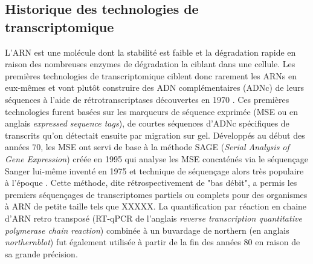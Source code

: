 \subsection{Historique des technologies de transcriptomique}

L'ARN est une molécule dont la stabilité est faible et la dégradation rapide en raison des nombreuses enzymes de dégradation la ciblant dans une cellule. Les premières technologies de transcriptomique ciblent donc rarement les ARNs en eux-mêmes et vont plutôt construire des ADN complémentaires (ADNc) de leurs séquences à l'aide de rétrotranscriptases découvertes en 1970 \cite{Temin1970Jun}. Ces premières technologies furent basées sur les marqueurs de séquence exprimée (MSE ou en anglais \textit{expressed sequence tags}), de courtes séquences d'ADNc spécifiques de transcrits qu'on détectait ensuite par migration sur gel. Développés au début des années 70, les MSE ont servi de base à la méthode SAGE (\textit{Serial Analysis of Gene Expression}) créée en 1995 \cite{Velculescu1995Oct} qui analyse les MSE concaténés via le séquençage Sanger lui-même inventé en 1975 \cite{Sanger1975May} et technique de séquençage alors très populaire à l'époque \cite{Marra1998Jan}. Cette méthode, dite rétrospectivement de "bas débit", a permis les premiers séquençages de transcriptomes partiels \cite{Jeppesen1970Apr} ou complets pour des organismes à ARN de petite taille \cite{Fiers1976Apr} tels que XXXXX. La quantification par réaction en chaine d'ARN retro transposé (RT-qPCR de l'anglais \textit{reverse transcription quantitative polymerase chain reaction}) combinée à un buvardage de northern (en anglais \textit{northernblot}) fut également utilisée à partir de la fin des années 80 en raison de sa grande précision\cite{Becker-Andre1989Nov}.


